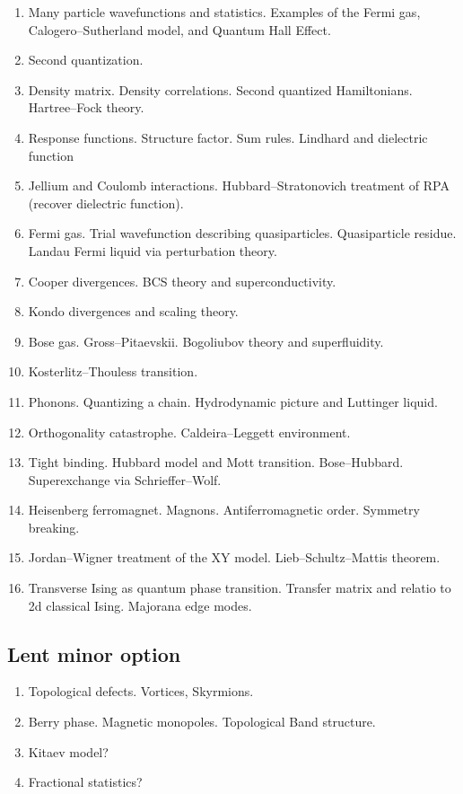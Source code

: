 \begin{enumerate}
\item Many particle wavefunctions and statistics. Examples of the Fermi gas, Calogero--Sutherland model, and Quantum Hall Effect.

\item Second quantization. 

\item Density matrix. Density correlations. Second quantized Hamiltonians. Hartree--Fock theory.

\item Response functions. Structure factor. Sum rules. Lindhard and dielectric function

\item Jellium and Coulomb interactions. Hubbard--Stratonovich treatment of RPA (recover dielectric function).

\item Fermi gas. Trial wavefunction describing quasiparticles. Quasiparticle residue. Landau Fermi liquid via perturbation theory. 

\item Cooper divergences. BCS theory and superconductivity. 

\item Kondo divergences and scaling theory.

\item Bose gas. Gross--Pitaevskii. Bogoliubov theory and superfluidity.

\item Kosterlitz--Thouless transition.

\item Phonons. Quantizing a chain. Hydrodynamic picture and Luttinger liquid.

\item Orthogonality catastrophe. Caldeira--Leggett environment.

\item Tight binding. Hubbard model and Mott transition. Bose--Hubbard. Superexchange via Schrieffer--Wolf.

\item Heisenberg ferromagnet. Magnons. Antiferromagnetic order. Symmetry breaking.

\item Jordan--Wigner treatment of the XY model. Lieb--Schultz--Mattis theorem.

\item Transverse Ising as quantum phase transition. Transfer matrix and relatio to 2d classical Ising. Majorana edge modes.

\end{enumerate}

\subsection{Lent minor option}


\begin{enumerate}

\item Topological defects. Vortices, Skyrmions. 

\item Berry phase. Magnetic monopoles. Topological Band structure.

\item Kitaev model?

\item Fractional statistics?
\end{enumerate}